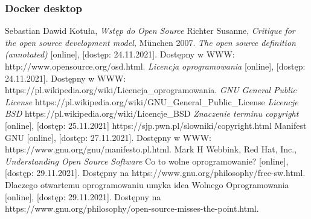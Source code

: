 \documentclass{article}
\begin{document}
\subsubsection{Docker desktop}

\newpage
\begin{thebibliography}{99}
    Sebastian Dawid Kotuła,
    \emph{Wstęp do Open Source}
  Richter Susanne, \emph{Critique for the open source development model,} München 2007.
  \emph{The open source definition (annotated)} [online], [dostęp: 24.11.2021]. Dostępny w WWW: http://www.opensource.org/osd.html.
  \emph{Licencja oprogramowania} [online], [dostęp: 24.11.2021]. Dostępny w WWW: https://pl.wikipedia.org/wiki/Licencja\_oprogramowania.
  \emph{GNU General Public License} https://pl.wikipedia.org/wiki/GNU\_General\_Public\_License
  \emph{Licencje BSD} https://pl.wikipedia.org/wiki/Licencje\_BSD
  \emph{Znaczenie terminu copyright} [online], [dostęp: 25.11.2021] https://sjp.pwn.pl/slowniki/copyright.html
  Manifest GNU [online], [dostęp: 27.11.2021]. Dostępny w WWW: https://www.gnu.org/gnu/manifesto.pl.html.
  Mark H Webbink, Red Hat, Inc., \emph{Understanding Open Source Software}
  Co to wolne oprogramowanie? [online], [dostęp: 29.11.2021]. Dostępny na https://www.gnu.org/philosophy/free-sw.html.
  Dlaczego otwartemu oprogramowaniu umyka idea Wolnego Oprogramowania [online], [dostęp: 29.11.2021]. Dostępny na https://www.gnu.org/philosophy/open-source-misses-the-point.html.
\end{thebibliography}
\end{document}
